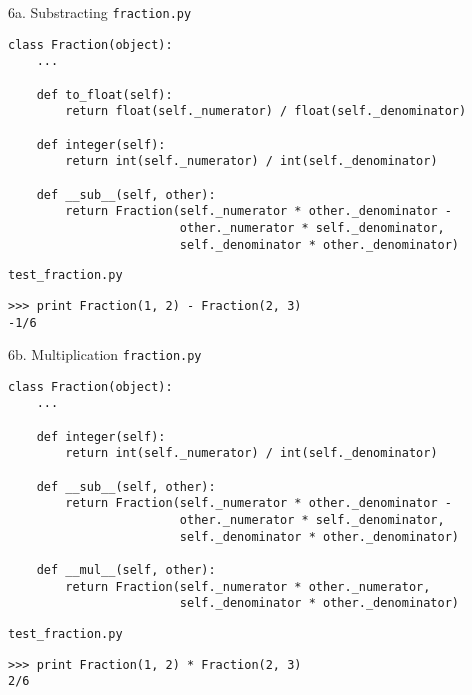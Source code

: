 \documentclass{beamer}
\begin{document}
\begin{frame}[fragile]{6a. Substracting}
\small
\texttt{fraction.py}
\begin{verbatim}
class Fraction(object):
    ...

    def to_float(self):
        return float(self._numerator) / float(self._denominator)

    def integer(self):
        return int(self._numerator) / int(self._denominator)

    def __sub__(self, other):
        return Fraction(self._numerator * other._denominator -
                        other._numerator * self._denominator,
                        self._denominator * other._denominator)
\end{verbatim}

\vfill

\texttt{test\_fraction.py}
\begin{verbatim}
>>> print Fraction(1, 2) - Fraction(2, 3)
-1/6
\end{verbatim}
\end{frame}


\begin{frame}[fragile]{6b. Multiplication}
\small
\texttt{fraction.py}
\begin{verbatim}
class Fraction(object):
    ...

    def integer(self):
        return int(self._numerator) / int(self._denominator)

    def __sub__(self, other):
        return Fraction(self._numerator * other._denominator -
                        other._numerator * self._denominator,
                        self._denominator * other._denominator)

    def __mul__(self, other):
        return Fraction(self._numerator * other._numerator,
                        self._denominator * other._denominator)
\end{verbatim}

\vfill

\texttt{test\_fraction.py}
\begin{verbatim}
>>> print Fraction(1, 2) * Fraction(2, 3)
2/6
\end{verbatim}
\end{frame}
\end{document}
